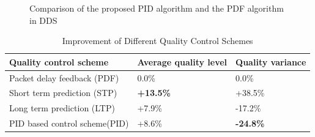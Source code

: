 \documentclass[journal]{IEEEtran}
\begin{document}
\begin{figure}[t]
\centering
{}
\caption{Comparison of the proposed PID algorithm and the PDF algorithm in DDS}
\label{fig:performance-two}
\end{figure}


\begin{table}[t]
\centering
\caption{Improvement of Different Quality Control Schemes}
\label{tab:improvement}
\begin{tabular}[b]{p{4.2cm}<{\centering}|p{4.2cm}<{\centering}|p{4.2cm}<{\centering}}
\hline \hline
Quality control scheme & Average quality level & Quality variance \\ \hline
Packet delay feedback (PDF) & 0.0\% & 0.0\% \\ \hline
Short term prediction (STP) & \textbf{+13.5\%} & +38.5\% \\ \hline
Long term prediction (LTP) & +7.9\% & -17.2\% \\ \hline
PID based control scheme(PID) & +8.6\% & \textbf{-24.8\%} \\ \hline
\end{tabular}
\end{table}
\end{document}
